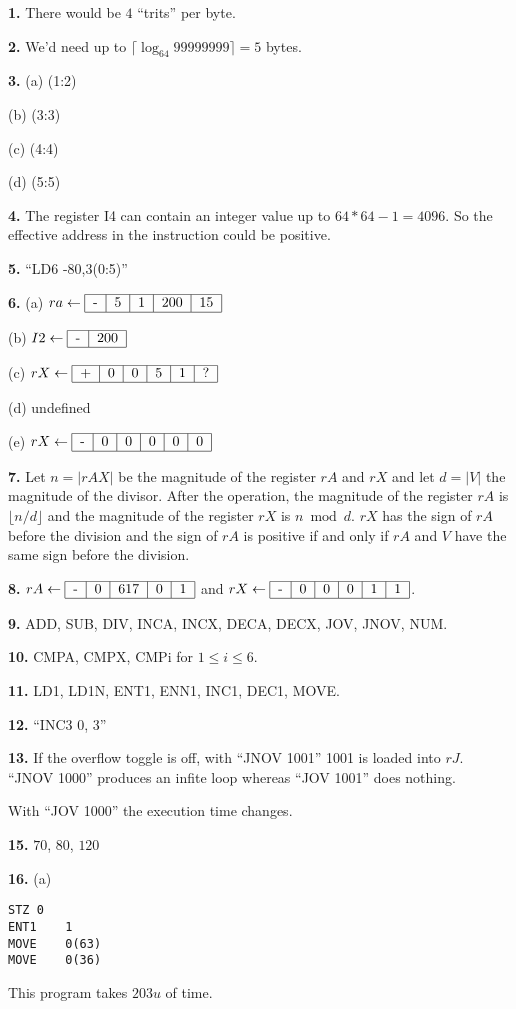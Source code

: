 \documentclass[a4paper,12pt]{article}
\newcommand{\newpar}[1]{\bigskip \noindent \textbf{#1.}}
\newcommand{\la}{\leftarrow}
\newcommand{\subpar}[1]{\medskip \noindent (#1)}
\newcommand{\cell}[1]
           {\begin{tabular}{|*{6}{c|}} \hline #1 \\ \hline \end{tabular}}
\begin{document}
\newpar{1} There would be $4$ ``trits'' per byte.

\newpar{2} We'd need up to $\lceil \log_{64}99999999\rceil = 5$ bytes.

\newpar{3} \subpar{a} (1:2)

\subpar{b} (3:3)

\subpar{c} (4:4)

\subpar{d} (5:5)

\newpar{4} The register I4 can contain an integer value up to
$64 * 64 - 1 = 4096$.  So the effective address in the instruction
could be positive.

\newpar{5} ``LD6 -80,3(0:5)''

\newpar{6}
\subpar{a} $ra \la \cell{-&5&1&200&15}$

\subpar{b} $I2 \la \cell{-&200}$

\subpar{c} $rX \la \cell{+&0&0&5&1&?}$

\subpar{d} undefined

\subpar{e} $rX \la \cell{-&0&0&0&0&0}$

\newpar{7} Let $n = |rAX|$ be the magnitude of the register $rA$ and $rX$
and let $d = |V|$ the magnitude of the divisor.  After the operation,
the magnitude of the register $rA$ is $\lfloor n/d\rfloor$ and the
magnitude of the register $rX$ is $n \bmod{d}$.  $rX$ has the sign of $rA$
before the division and the sign of $rA$ is positive if and only if $rA$
and $V$ have the same sign before the division.

\newpar{8} $rA \la \cell{-&0&617&0&1}$ and $rX \la
\cell{-&0&0&0&1&1}$.

\newpar{9} ADD, SUB, DIV, INCA, INCX, DECA, DECX, JOV, JNOV, NUM.

\newpar{10} CMPA, CMPX, CMPi for $1 \le i \le 6$.

\newpar{11} LD1, LD1N, ENT1, ENN1, INC1, DEC1, MOVE.

\newpar{12} ``INC3 0, 3''

\newpar{13} If the overflow toggle is off, with ``JNOV 1001'' 1001 is
loaded into $rJ$.  ``JNOV 1000'' produces an infite loop whereas ``JOV
1001'' does nothing.

With ``JOV 1000'' the execution time changes.

\newpar{15} $70$, $80$, $120$

\newpar{16}
\subpar{a}
\begin{verbatim}
STZ	0
ENT1	1
MOVE	0(63)
MOVE	0(36)
\end{verbatim}
This program takes $203u$ of time.
\end{document}
